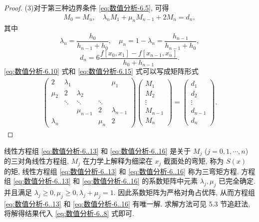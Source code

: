 \documentclass[../../main.tex]{subfiles}%
\begin{document}
\begin{proof}
(3)对于第三种边界条件 \eqref{eq:数值分析-6.5}, 可得
\begin{align}
M_0 = M_n, \quad \lambda_n M_1 + \mu_n M_{n - 1} + 2 M_n = d_n, \label{eq:数值分析-6.15}
\end{align}
其中
\[
\lambda_n = \frac{h_0}{h_{n - 1} + h_0}, \quad \mu_n = 1 - \lambda_n = \frac{h_{n - 1}}{h_{n - 1} + h_0},
\]
\[
d_n = 6 \frac{f[x_0, x_1] - f[x_{n - 1}, x_n]}{h_0 + h_{n - 1}}.
\]
\eqref{eq:数值分析-6.10} 式和 \eqref{eq:数值分析-6.15} 式可以写成矩阵形式
\begin{align}
\begin{pmatrix}
2 & \lambda_1 & & & \mu_1 \\
\mu_2 & 2 & \lambda_2 & & \\
& \ddots & \ddots & \ddots & \\
& & \mu_{n - 1} & 2 & \lambda_{n - 1} \\
\lambda_n & & & \mu_n & 2
\end{pmatrix}
\begin{pmatrix}
M_1 \\
M_2 \\
\vdots \\
M_{n - 1} \\
M_n
\end{pmatrix}
=
\begin{pmatrix}
d_1 \\
d_2 \\
\vdots \\
d_{n - 1} \\
d_n
\end{pmatrix}. \label{eq:数值分析-6..16}
\end{align}
\end{proof}
\begin{remark}
线性方程组 \eqref{eq:数值分析-6..13} 和 \eqref{eq:数值分析-6..16} 是关于 $M_j$ ($j = 0, 1, \cdots, n$) 的三对角线性方程组, $M_j$ 在力学上解释为细梁在 $x_j$ 截面处的弯矩, 称为 $S(x)$ 的矩, 线性方程组 \eqref{eq:数值分析-6..13} 和 \eqref{eq:数值分析-6..16} 称为三弯矩方程. 方程组 \eqref{eq:数值分析-6..13} 和 \eqref{eq:数值分析-6..16} 的系数矩阵中元素 $\lambda_j, \mu_j$ 已完全确定. 并且满足 $\lambda_j \geqslant 0, \mu_j \geqslant 0, \lambda_j + \mu_j = 1$. 因此系数矩阵为严格对角占优阵, 从而方程组 \eqref{eq:数值分析-6..13} 和 \eqref{eq:数值分析-6..16} 有唯一解. 求解方法可见 5.3 节追赶法, 将解得结果代入 \eqref{eq:数值分析-6..8} 式即可.
\end{remark}
\end{document}
